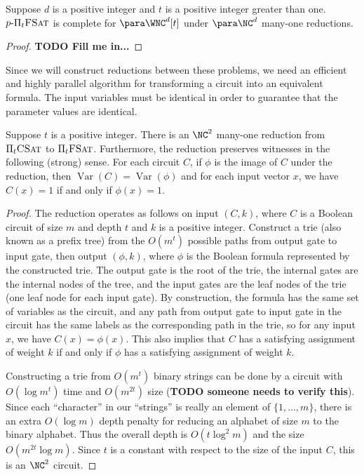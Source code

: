 \documentclass{article}
\newcommand{\todo}[1]{\textbf{TODO #1}}
\newcommand{\dash}{\textnormal{-}}
\newcommand{\pPiFSAT}{p \dash \Pi_t \textsc{FSat}}
\newcommand{\PiFSAT}{\Pi_t \textsc{FSat}}
\newcommand{\PiCSAT}{\Pi_t \textsc{CSat}}
\DeclareMathOperator{\Var}{Var}
\begin{document}
\begin{theorem}\label{thm:ppifsat}
  Suppose $d$ is a positive integer and $t$ is a positive integer greater than one.
  $\pPiFSAT$ is complete for $\para \WNC^d[t]$ under $\para \NC^d$ many-one reductions.
\end{theorem}
\begin{proof}
  \todo{Fill me in...}
\end{proof}

Since we will construct reductions between these problems, we need an efficient and highly parallel algorithm for transforming a circuit into an equivalent formula.
The input variables must be identical in order to guarantee that the parameter values are identical.

\begin{lemma}\label{lem:circuittoformula}
  Suppose $t$ is a positive integer.
  There is an $\NC^2$ many-one reduction from $\PiCSAT$ to $\PiFSAT$.
  Furthermore, the reduction preserves witnesses in the following (strong) sense.
  For each circuit $C$, if $\phi$ is the image of $C$ under the reduction, then $\Var(C) = \Var(\phi)$ and for each input vector $x$, we have $C(x) = 1$ if and only if $\phi(x) = 1$.
\end{lemma}
\begin{proof}
  The reduction operates as follows on input $(C, k)$, where $C$ is a Boolean circuit of size $m$ and depth $t$ and $k$ is a positive integer.
  Construct a trie (also known as a prefix tree) from the $O(m^t)$ possible paths from output gate to input gate, then output $(\phi, k)$, where $\phi$ is the Boolean formula represented by the constructed trie.
  The output gate is the root of the trie, the internal gates are the internal nodes of the tree, and the input gates are the leaf nodes of the trie (one leaf node for each input gate).
  By construction, the formula has the same set of variables as the circuit, and any path from output gate to input gate in the circuit has the same labels as the corresponding path in the trie, so for any input $x$, we have $C(x) = \phi(x)$.
  This also implies that $C$ has a satisfying assignment of weight $k$ if and only if $\phi$ has a satisfying assignment of weight $k$.

  Constructing a trie from $O(m^t)$ binary strings can be done by a circuit with $O(\log m^t)$ time and $O(m^{2t})$ size \autocite{lv86} (\todo{someone needs to verify this}).
  Since each ``character'' in our ``strings'' is really an element of $\{1, \dotsc, m\}$, there is an extra $O(\log m)$ depth penalty for reducing an alphabet of size $m$ to the binary alphabet.
  Thus the overall depth is $O(t \log^2 m)$ and the size $O(m^{2t} \log m)$.
  Since $t$ is a constant with respect to the size of the input $C$, this is an $\NC^2$ circuit.
\end{proof}
\end{document}
